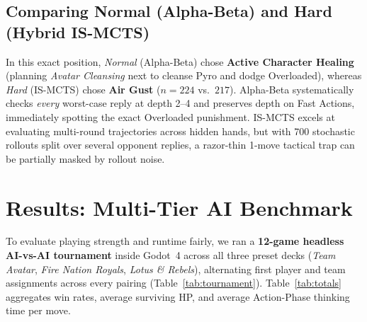 \documentclass[11pt,a4paper]{article}
\begin{document}
\subsection{Comparing Normal (Alpha-Beta) and Hard (Hybrid IS-MCTS)}

In this exact position, \emph{Normal} (Alpha-Beta) chose \textbf{Active Character Healing} (planning \emph{Avatar Cleansing} next to cleanse Pyro and dodge Overloaded), whereas \emph{Hard} (IS-MCTS) chose \textbf{Air Gust} ($n=224$ vs.\ $217$). Alpha-Beta systematically checks \emph{every} worst-case reply at depth 2--4 and preserves depth on Fast Actions, immediately spotting the exact Overloaded punishment. IS-MCTS excels at evaluating multi-round trajectories across hidden hands, but with 700 stochastic rollouts split over several opponent replies, a razor-thin 1-move tactical trap can be partially masked by rollout noise.

\section{Results: Multi-Tier AI Benchmark}

To evaluate playing strength and runtime fairly, we ran a \textbf{12-game headless AI-vs-AI tournament} inside Godot~4 across all three preset decks (\emph{Team Avatar}, \emph{Fire Nation Royals}, \emph{Lotus \& Rebels}), alternating first player and team assignments across every pairing (Table~\ref{tab:tournament}). Table~\ref{tab:totals} aggregates win rates, average surviving HP, and average Action-Phase thinking time per move.
\end{document}
